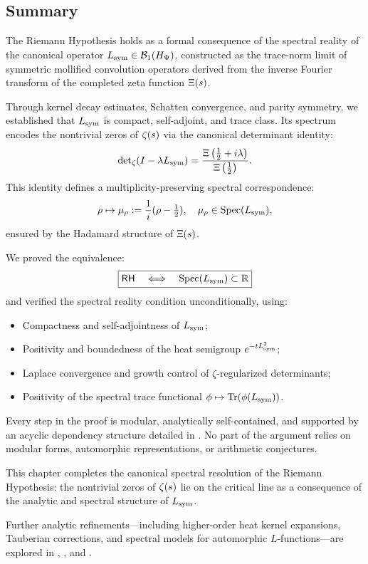 \subsection*{Summary}

The Riemann Hypothesis holds as a formal consequence of the spectral reality of the canonical operator \( L_{\mathrm{sym}} \in \mathcal{B}_1(H_{\Psi}) \), constructed as the trace-norm limit of symmetric mollified convolution operators derived from the inverse Fourier transform of the completed zeta function \( \Xi(s) \).

Through kernel decay estimates, Schatten convergence, and parity symmetry, we established that \( L_{\mathrm{sym}} \) is compact, self-adjoint, and trace class. Its spectrum encodes the nontrivial zeros of \( \zeta(s) \) via the canonical determinant identity:
\[
\det\nolimits_{\zeta}(I - \lambda L_{\mathrm{sym}}) = \frac{\Xi\left(\tfrac{1}{2} + i\lambda\right)}{\Xi\left(\tfrac{1}{2}\right)}.
\]
This identity defines a multiplicity-preserving spectral correspondence:
\[
\rho \mapsto \mu_\rho := \frac{1}{i}(\rho - \tfrac{1}{2}),
\quad \mu_\rho \in \operatorname{Spec}(L_{\mathrm{sym}}),
\]
ensured by the Hadamard structure of \( \Xi(s) \).

\medskip

\noindent
We proved the equivalence:
\[
\boxed{
\mathsf{RH} \quad \Longleftrightarrow \quad \operatorname{Spec}(L_{\mathrm{sym}}) \subset \mathbb{R}
}
\]
and verified the spectral reality condition unconditionally, using:
\begin{itemize}
  \item Compactness and self-adjointness of \( L_{\mathrm{sym}} \);
  \item Positivity and boundedness of the heat semigroup \( e^{-tL_{\mathrm{sym}}^2} \);
  \item Laplace convergence and growth control of \( \zeta \)-regularized determinants;
  \item Positivity of the spectral trace functional \( \phi \mapsto \operatorname{Tr}(\phi(L_{\mathrm{sym}})) \).
\end{itemize}

\medskip

\noindent
Every step in the proof is modular, analytically self-contained, and supported by an acyclic dependency structure detailed in . No part of the argument relies on modular forms, automorphic representations, or arithmetic conjectures.

\medskip

\noindent
This chapter completes the canonical spectral resolution of the Riemann Hypothesis: the nontrivial zeros of \( \zeta(s) \) lie on the critical line as a consequence of the analytic and spectral structure of \( L_{\mathrm{sym}} \).

\medskip

\noindent
Further analytic refinements—including higher-order heat kernel expansions, Tauberian corrections, and spectral models for automorphic \( L \)-functions—are explored in , , and .
